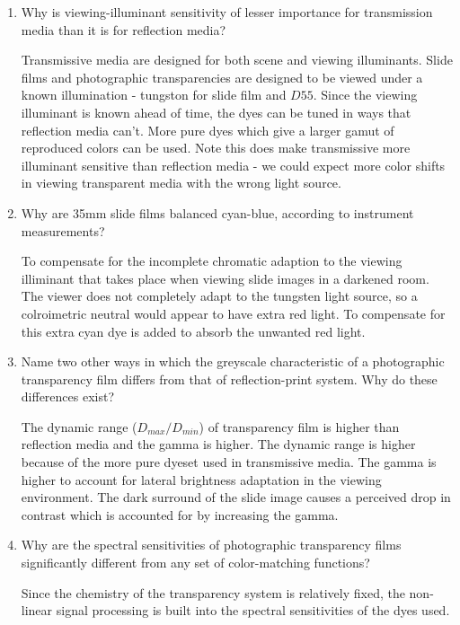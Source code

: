 \begin{enumerate}
 \item
   Why is viewing-illuminant sensitivity of lesser importance for transmission media than it is for reflection media? \newline
 \par Transmissive media are designed for both scene and viewing illuminants.  Slide films and photographic transparencies are designed to be viewed under a known illumination - tungston for slide film and $D{55}$. Since the viewing illuminant is known ahead of time, the dyes can be tuned in ways that reflection media can't. More pure dyes which give a larger gamut of reproduced colors can be used.  Note this does make transmissive more illuminant sensitive than reflection media - we could expect more color shifts in viewing transparent media with the wrong light source. \newline
 \item
   Why are 35mm slide films balanced cyan-blue, according to instrument measurements? \newline
 \par To compensate for the incomplete chromatic adaption to the viewing illiminant that takes place when viewing slide images in a darkened room.  The viewer does not completely adapt to the tungsten light source, so a colroimetric neutral would appear to have extra red light.  To compensate for this extra cyan dye is added to absorb the unwanted red light. \newline
 \item
  Name two other ways in which the greyscale characteristic of a photographic transparency film differs from that of reflection-print system. Why do these differences exist? \newline
 \par The dynamic range ($D_{max}/D_{min}$) of transparency film is higher than reflection media and the gamma is higher.  The dynamic range is higher because of the more pure dyeset used in transmissive media.  The gamma is higher to account for lateral brightness adaptation in the viewing environment.  The dark surround of the slide image causes a perceived drop in contrast which is accounted for by increasing the gamma. \newline
 \item
  Why are the spectral sensitivities of photographic transparency films significantly different from any set of color-matching functions? \newline
 \par Since the chemistry of the transparency system is relatively fixed, the non-linear signal processing is built into the spectral sensitivities of the dyes used. \newline

\end{enumerate}
